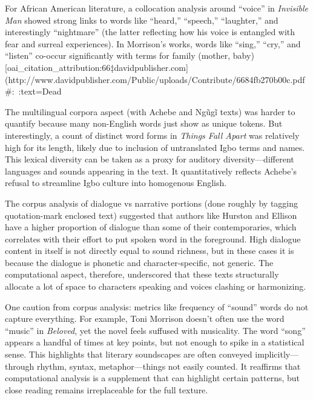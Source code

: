 \documentclass[12pt]{report}
\begin{document}
   For African American literature, a collocation analysis around “voice” in \textit{Invisible Man} showed strong links to words like “heard,” “speech,” “laughter,” and interestingly “nightmare” (the latter reflecting how his voice is entangled with fear and surreal experiences). In Morrison’s works, words like “sing,” “cry,” and “listen” co-occur significantly with terms for family (mother, baby) [oai_citation_attribution:66‡davidpublisher.com](http://www.davidpublisher.com/Public/uploads/Contribute/6684fb270b00c.pdf#:~:text=Dead%

   The multilingual corpora aspect (with Achebe and Ngũgĩ texts) was harder to quantify because many non-English words just show as unique tokens. But interestingly, a count of distinct word forms in \textit{Things Fall Apart} was relatively high for its length, likely due to inclusion of untranslated Igbo terms and names. This lexical diversity can be taken as a proxy for auditory diversity—different languages and sounds appearing in the text. It quantitatively reflects Achebe’s refusal to streamline Igbo culture into homogenous English. 

   The corpus analysis of dialogue vs narrative portions (done roughly by tagging quotation-mark enclosed text) suggested that authors like Hurston and Ellison have a higher proportion of dialogue than some of their contemporaries, which correlates with their effort to put spoken word in the foreground. High dialogue content in itself is not directly equal to sound richness, but in these cases it is because the dialogue is phonetic and character-specific, not generic. The computational aspect, therefore, underscored that these texts structurally allocate a lot of space to characters speaking and voices clashing or harmonizing.

   One caution from corpus analysis: metrics like frequency of “sound” words do not capture everything. For example, Toni Morrison doesn’t often use the word “music” in \textit{Beloved}, yet the novel feels suffused with musicality. The word “song” appears a handful of times at key points, but not enough to spike in a statistical sense. This highlights that literary soundscapes are often conveyed implicitly—through rhythm, syntax, metaphor—things not easily counted. It reaffirms that computational analysis is a supplement that can highlight certain patterns, but close reading remains irreplaceable for the full texture.
\end{document}
